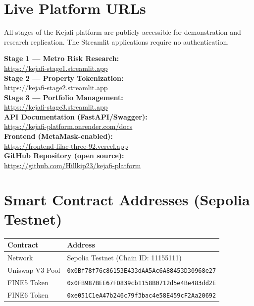 \documentclass[11pt,letterpaper]{article}
\begin{document}
\newpage
\appendix

\section{Live Platform URLs}
\label{app:urls}

All stages of the Kejafi platform are publicly accessible for demonstration and
research replication. The Streamlit applications require no authentication.

\begin{tcolorbox}[
  colback=lightgray,
  colframe=kejafiDark,
  width=\textwidth,
  arc=4pt,
  title={\textbf{\color{white}Kejafi Platform Access}},
  coltitle=white,
  colbacktitle=kejafiDark
]
\small
\textbf{Stage 1 --- Metro Risk Research:}\\
\url{https://kejafi-stage1.streamlit.app}\\[0.4em]
\textbf{Stage 2 --- Property Tokenization:}\\
\url{https://kejafi-stage2.streamlit.app}\\[0.4em]
\textbf{Stage 3 --- Portfolio Management:}\\
\url{https://kejafi-stage3.streamlit.app}\\[0.4em]
\textbf{API Documentation (FastAPI/Swagger):}\\
\url{https://kejafi-platform.onrender.com/docs}\\[0.4em]
\textbf{Frontend (MetaMask-enabled):}\\
\url{https://frontend-lilac-three-92.vercel.app}\\[0.4em]
\textbf{GitHub Repository (open source):}\\
\url{https://github.com/Hillkip23/kejafi-platform}
\end{tcolorbox}

\section{Smart Contract Addresses (Sepolia Testnet)}
\label{app:contracts}

\begin{table}[H]
\centering
\begin{tabular}{ll}
\toprule
\textbf{Contract} & \textbf{Address} \\
\midrule
Network         & Sepolia Testnet (Chain ID: 11155111) \\
Uniswap V3 Pool & \texttt{0x0Bf78f76c86153E433dAA5Ac6A88453D30968e27} \\
FINE5 Token     & \texttt{0x0FB987BEE67FD839cb1158B0712d5e4Be483dd2E} \\
FINE6 Token     & \texttt{0xe051C1eA47b246c79f3bac4e58E459cF2Aa20692} \\
\bottomrule
\end{tabular}
\end{table}
\end{document}
